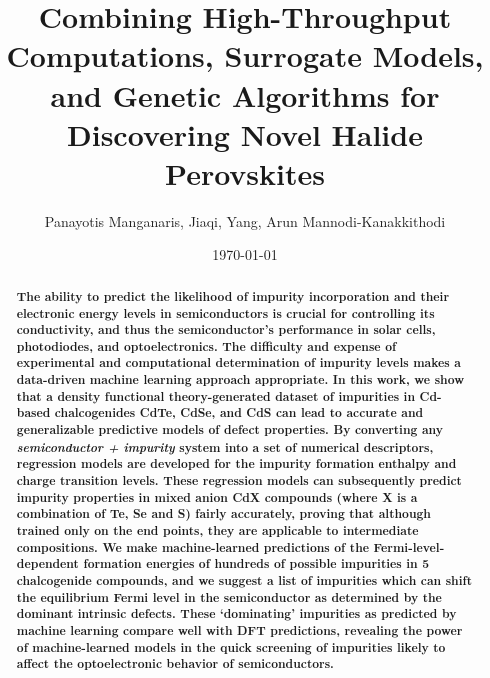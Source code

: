 \documentclass[]{revtex4-2}
\begin{document}
\title[]{Combining High-Throughput Computations, Surrogate Models, and Genetic Algorithms for Discovering Novel Halide Perovskites}



\author{Panayotis Manganaris, Jiaqi, Yang, Arun Mannodi-Kanakkithodi}
%

\date{\today}%




\maketitle




\begin{abstract}

\textbf{The ability to predict the likelihood of impurity incorporation and their electronic energy levels in semiconductors is crucial for controlling its conductivity, and thus the semiconductor's performance in solar cells, photodiodes, and optoelectronics. The difficulty and expense of experimental and computational determination of impurity levels makes a data-driven machine learning approach appropriate. In this work, we show that a density functional theory-generated dataset of impurities in Cd-based chalcogenides CdTe, CdSe, and CdS can lead to accurate and generalizable predictive models of defect properties. By converting any \textit{semiconductor + impurity} system into a set of numerical descriptors, regression models are developed for the impurity formation enthalpy and charge transition levels. These regression models can subsequently predict impurity properties in mixed anion CdX compounds (where X is a combination of Te, Se and S) fairly accurately, proving that although trained only on the end points, they are applicable to intermediate compositions. We make machine-learned predictions of the Fermi-level-dependent formation energies of hundreds of possible impurities in 5 chalcogenide compounds, and we suggest a list of impurities which can shift the equilibrium Fermi level in the semiconductor as determined by the dominant intrinsic defects. These `dominating' impurities as predicted by machine learning compare well with DFT predictions, revealing the power of machine-learned models in the quick screening of impurities likely to affect the optoelectronic behavior of semiconductors.}

\end{abstract}
\end{document}
